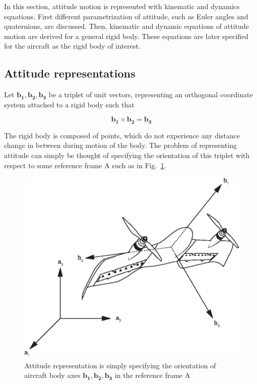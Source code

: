 In this section, attitude motion is represented with kinematic and dynamics equations. 
First different parametrization of attitude, such as Euler angles and quaternions, are discussed. 
Then, kinematic and dynamic equations of attitude motion are derived for a general rigid body. 
These equations are later specified for the aircraft as the rigid body of interest. 

\subsection{Attitude representations}
Let $\bm{b_1}, \bm{b_2}, \bm{b_3}$ be a triplet of unit vectors, representing an orthogonal coordinate system attached to a rigid body such that

\begin{equation}
\label{eqn:unitVectors}
\bm{b_1}\times \bm{b_2}= \bm{b_3}
\end{equation}

The rigid body is composed of points, which do not experience any distance change in between during motion of the body. 
The problem of representing attitude can simply be thought of specifying the orientation of this triplet with respect to some reference frame A such as in Fig.~\ref{fig:theTwoFrames}.

\begin{figure}
\begin{center}
\includegraphics[width=13cm]{figures/DarkoAxesElgiz}    %
\caption{Attitude representation is simply specifying the orientation of 
aircraft body axes $\bm{b_1}, \bm{b_2}, \bm{b_3}$ in the reference frame A} 
\label{fig:theTwoFrames}
\end{center}
\end{figure}

